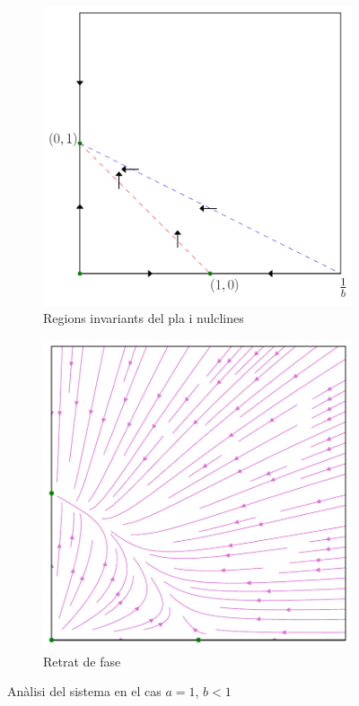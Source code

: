 \documentclass[12pt]{article}
\numberwithin{table}{section}
\numberwithin{equation}{section}
\numberwithin{figure}{section}
\begin{document}
\begin{figure}
	\centering
	\begin{subfigure}[htb]{0.48\textwidth}
		\centering
		\includegraphics[width=\textwidth]{retrat-4a.pdf}
		\caption{Regions invariants del pla i nulclines}
		\label{fig:retrat 4a}
	\end{subfigure}
	\begin{subfigure}[htb]{0.48\textwidth}
		\centering
		\includegraphics[width=\textwidth]{retrat-4b.pdf}
		\caption{Retrat de fase}
		\label{fig:retrat 4b}
	\end{subfigure}
	\caption{Anàlisi del sistema en el cas \( a = 1 \), \( b < 1 \)}
	\label{fig:retrat 4}
\end{figure}
\end{document}
